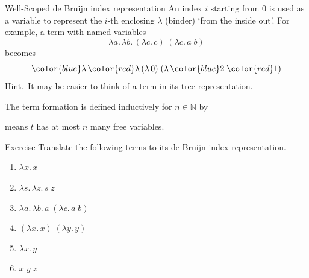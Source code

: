 \begin{frame}[allowframebreaks]{Well-Scoped de Bruijn index representation}
  An index $i$ starting from $0$ is used as a variable to represent the $i$-th enclosing $\lambda$ (binder) `from the inside out'.
  For example, a term with named variables
  \[
    \lambda a.\,\lambda b.\, (\lambda c.\, c) \;(\lambda c.\, a\;b)
  \]
  becomes
  \[
  {\color{blue}\lambda}\, {\color{red}\lambda}\, (\lambda\,0) \;(\lambda\,{\color{blue} 2}\;{\color{red}1})
  \]
  Hint.\ It may be easier to think of a term in its tree representation.
  \begin{definition}
    The term formation  is defined inductively for $n \in \mathbb{N}$ by
    \begin{minipage}{.45\textwidth}
      \begin{prooftree}
      \end{prooftree}
    \end{minipage}
    \begin{minipage}{.45\textwidth}
      \begin{prooftree}
      \end{prooftree}
    \end{minipage}
      \begin{prooftree}
      \end{prooftree}
     means $t$ has at most $n$ many free variables.
  \end{definition}
  
\end{frame}

\begin{frame}{Exercise}
  Translate the following terms to its de Bruijn index representation. 
  \begin{enumerate}
    \item $\lambda x.\, x$
    \item $\lambda s.\,\lambda z.\, s \;z$
    \item $\lambda a.\,\lambda b.\, a\;(\lambda c.\, a\; b)$
    \item $(\lambda x.\, x)\;(\lambda y.\, y)$
    \item $\lambda x.\, y$
    \item $x\;y\;z$
  \end{enumerate}
\end{frame}

